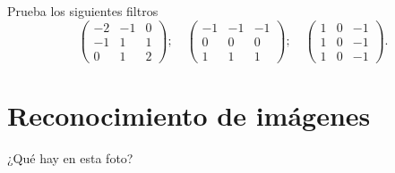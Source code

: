 \begin{frame}{Prueba los siguientes filtros}
    \[
        \begin{pmatrix}
            -2& -1& 0\\
            -1& 1& 1\\
             0& 1& 2
        \end{pmatrix};\quad
        \begin{pmatrix}
            -1& -1& -1\\
            0& 0& 0\\
            1& 1& 1
        \end{pmatrix};\quad
        \begin{pmatrix}
            1& 0& -1\\
            1& 0& -1\\
            1& 0& -1
        \end{pmatrix}.
    \]

\end{frame}


\section{Reconocimiento de imágenes}

\begin{frame}{¿Qué hay en esta foto?}
    
    \begin{center}
    \end{center}

\end{frame}